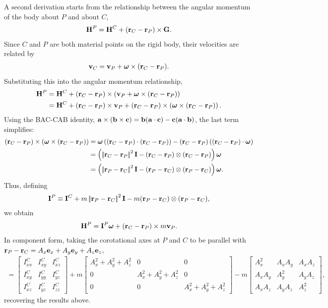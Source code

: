 \documentclass[
  letterpaper,
  DIV=11,
  numbers=noendperiod]{scrreprt}
\newcommand{\lnorm}{\left|\!\left|}
\newcommand{\rnorm}{\right|\!\right|}
\newcommand{\lp}{\left(}
\newcommand{\rp}{\right)}
\newcommand{\bomega}{\boldsymbol{\omega}}
\begin{document}
A second derivation starts from the relationship between the angular
momentum of the body about \(P\) and about \(C\), \begin{align}
    {\bf H}^P = {\bf H}^C+({\bf r}_C-{\bf r}_P)\times{\bf G}.
\end{align} Since \(C\) and \(P\) are both material points on the rigid
body, their velocities are related by \begin{align}
    {\bf v}_C = {\bf v}_P+\bomega\times({\bf r}_C-{\bf r}_P).
\end{align} Substituting this into the angular momentum relationship,
\begin{align}
    {\bf H}^P &= {\bf H}^C+({\bf r}_C-{\bf r}_P)\times\lp{\bf v}_P+\bomega\times({\bf r}_C-{\bf r}_P)\rp\\
    &= {\bf H}^C+({\bf r}_C-{\bf r}_P)\times{\bf v}_P+({\bf r}_C-{\bf r}_P)\times\lp\bomega\times({\bf r}_C-{\bf r}_P)\rp.
\end{align} Using the BAC-CAB identity,
\({\bf a}\times({\bf b}\times{\bf c})={\bf b}({\bf a}\cdot{\bf c})-{\bf c}({\bf a}\cdot{\bf b})\),
the last term simplifies: \begin{align}
    ({\bf r}_C-{\bf r}_P)\times\lp\bomega\times({\bf r}_C-{\bf r}_P)\rp &= \bomega\lp({\bf r}_C-{\bf r}_P)\cdot({\bf r}_C-{\bf r}_P)\rp-({\bf r}_C-{\bf r}_P)\lp({\bf r}_C-{\bf r}_P)\cdot\bomega\rp\\
    &= \lp\lnorm{\bf r}_C-{\bf r}_P\rnorm^2{\bf I}-({\bf r}_C-{\bf r}_P)\otimes({\bf r}_C-{\bf r}_P)\rp\bomega\\
    &= \lp\lnorm{\bf r}_P-{\bf r}_C\rnorm^2{\bf I}-({\bf r}_P-{\bf r}_C)\otimes({\bf r}_P-{\bf r}_C)\rp\bomega.
\end{align} Thus, defining \begin{align}
    {\bf I}^P \equiv {\bf I}^C+m\lnorm{\bf r}_P-{\bf r}_C\rnorm^2{\bf I}-m({\bf r}_P-{\bf r}_C)\otimes({\bf r}_P-{\bf r}_C),
\end{align} we obtain \begin{align}
    {\bf H}^P = {\bf I}^P\bomega+({\bf r}_C-{\bf r}_P)\times m{\bf v}_P.
\end{align} In component form, taking the corotational axes at \(P\) and
\(C\) to be parallel with
\({\bf r}_P-{\bf r}_C = A_x{\bf e}_x+A_y{\bf e}_y+A_z{\bf e}_z\),
\begin{align}
    [{\bf I}^P] =
    \begin{bmatrix}I^C_{xx}&I^C_{xy}&I^C_{xz}\\I^C_{xy}&I^C_{yy}&I^C_{yz}\\I^C_{xz}&I^C_{yz}&I^C_{zz}\end{bmatrix}
    +m\begin{bmatrix}A_x^2+A_y^2+A_z^2&0&0\\0&A_x^2+A_y^2+A_z^2&0\\0&0&A_x^2+A_y^2+A_z^2\end{bmatrix}
    -m\begin{bmatrix}A_x^2&A_xA_y&A_xA_z\\A_xA_y&A_y^2&A_yA_z\\A_xA_z&A_yA_z&A_z^2\end{bmatrix},
\end{align} recovering the results above.
\end{document}
